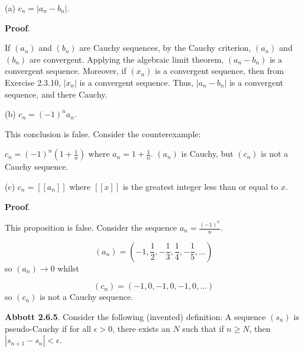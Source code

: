 \documentclass[10pt]{article}
\begin{document}
(a) $\displaystyle c_{n} =|a_{n} -b_{n} |$.



\textbf{Proof}.



If $\displaystyle ( a_{n})$ and $\displaystyle ( b_{n})$ are Cauchy sequences, by the Cauchy criterion, $\displaystyle ( a_{n})$ and $\displaystyle ( b_{n})$ are convergent. Applying the algebraic limit theorem, $\displaystyle ( a_{n} -b_{n})$ is a convergent sequence. Moreover, if $\displaystyle ( x_{n})$ is a convergent sequence, then from Exercise 2.3.10, $\displaystyle |x_{n} |$ is a convergent sequence. Thus, $\displaystyle |a_{n} -b_{n} |$ is a convergent sequence, and there Cauchy.



(b) $\displaystyle c_{n} =( -1)^{n} a_{n}$.



This conclusion is false. Consider the counterexample:



$\displaystyle c_{n} =( -1)^{n}\left( 1+\frac{1}{n}\right)$ where $\displaystyle a_{n} =1+\frac{1}{n}$. $\displaystyle ( a_{n})$ is Cauchy, but $\displaystyle ( c_{n})$ is not a Cauchy sequence.



(c) $\displaystyle c_{n} =[[ a_{n}]]$ where $\displaystyle [[ x]]$ is the greatest integer less than or equal to $\displaystyle x$.



\textbf{Proof}.



This proposition is false. Consider the sequence $\displaystyle a_{n} =\frac{( -1)^{n}}{n}$. 




\begin{equation*}
( a_{n}) =\left( -1,\frac{1}{2} ,-\frac{1}{3} ,\frac{1}{4} ,-\frac{1}{5} ,\dotsc \right)
\end{equation*}
so $\displaystyle ( a_{n})\rightarrow 0$ whilst 


\begin{equation*}
( c_{n}) =( -1,0,-1,0,-1,0,\dotsc )
\end{equation*}
so $\displaystyle ( c_{n})$ is not a Cauchy sequence.



\textbf{Abbott 2.6.5}. Consider the following (invented) definition: A sequence $\displaystyle ( s_{n})$ is pseudo-Cauchy if for all $\displaystyle \epsilon  >0$, there exists an $\displaystyle N$ such that if $\displaystyle n\geq N$, then $\displaystyle |s_{n+1} -s_{n} |< \epsilon $. 
\end{document}
